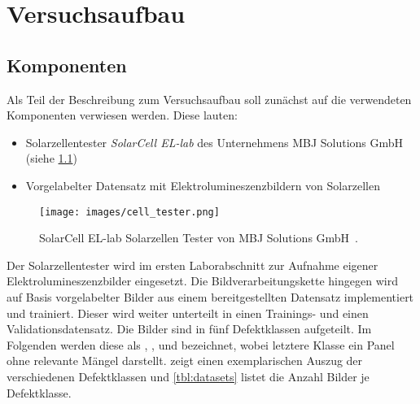 \chapter{Versuchsaufbau}

\section{Komponenten}

Als Teil der Beschreibung zum Versuchsaufbau soll zunächst auf die verwendeten Komponenten verwiesen werden. Diese lauten:

\begin{itemize}
    \item Solarzellentester \emph{SolarCell EL-lab} des Unternehmens MBJ Solutions GmbH (siehe \cref{fig:cell_tester})
    \item Vorgelabelter Datensatz mit Elektrolumineszenzbildern von Solarzellen
\end{itemize}

\begin{figure}[ht]
    \centering
    \texttt{[image: images/cell\_tester.png]}
    \caption[SolarCell EL-lab Solarzellen Tester von MBJ Solutions GmbH.]{SolarCell EL-lab Solarzellen Tester von MBJ Solutions GmbH~\cite{mbj2022}.\label{fig:cell_tester}}
\end{figure}

Der Solarzellentester wird im ersten Laborabschnitt zur Aufnahme eigener Elektrolumineszenzbilder eingesetzt. Die Bildverarbeitungskette hingegen wird auf Basis vorgelabelter Bilder aus einem bereitgestellten Datensatz implementiert und trainiert. Dieser wird weiter unterteilt in einen Trainings- und einen Validationsdatensatz. Die Bilder sind in fünf Defektklassen aufgeteilt. Im Folgenden werden diese als , ,  und  bezeichnet, wobei letztere Klasse ein Panel ohne relevante Mängel darstellt.  zeigt einen exemplarischen Auszug der verschiedenen Defektklassen und \cref{tbl:datasets} listet die Anzahl Bilder je Defektklasse.

